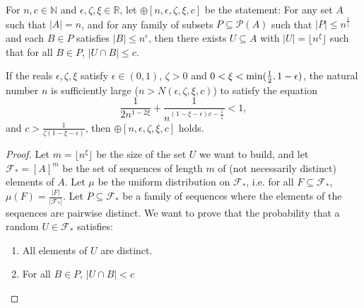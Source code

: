         \begin{definition} \label{def:n_large_enough_property}
            For $n, c \in \mathbb{N}$ and $\epsilon, \zeta, \xi \in \mathbb{R}$, let $\oplus[n, \epsilon, \zeta, \xi, c]$ be
            the statement:
            For any set $A$ such that $|A| = n$, and for any family of subsets $P \subseteq \mathcal{P}(A)$ such that
            $|P| \leq n^{\frac{1}{\zeta}}$ and each $B \in P$ satisfies $|B| \leq n^\epsilon$, then there exists $U \subseteq A$
            with $|U| = \lfloor n^\xi \rfloor$ such that for all $B \in P$, $|U \cap B| \leq c$.
        \end{definition}

        \begin{lemma} \label{lem:n_large_enough_valid_values}
            If the reals $\epsilon, \zeta, \xi$ satisfy $\epsilon \in (0,1)$, $\zeta > 0$ and $0 < \xi < \min ( \frac{1}{2}, 1 - \epsilon )$,
            the natural number $n$ is sufficiently large ($n > N(\epsilon, \zeta, \xi, c)$) to satisfy the equation
                \begin{equation} \label{eq:n_large_enough_valid_values.1}
                    \frac{1}{2n^{1-2\xi}} + \frac{1}{n^{(1 - \xi - \epsilon)c - \frac{1}{\zeta}}} < 1,
                \end{equation}
            and $c > \frac{1}{\zeta (1 - \xi - \epsilon)}$,
            then $\oplus[n, \epsilon, \zeta, \xi, c]$ holds.
            \begin{proof}
                Let $m = \lfloor n^\xi \rfloor$ be the size of the set $U$ we want to build, and let $\mathcal{F}_* = [A]^m$ be
                the set of sequences of length $m$ of (not necessarily distinct) elements of $A$.
                Let $\mu$ be the uniform distribution on $\mathcal{F}_*$, i.e. for all $F \subseteq \mathcal{F}_*$,
                $\mu(F) = \frac{|F|}{|\mathcal{F}_*|}$.
                Let $P \subseteq \mathcal{F}_*$ be a family of sequences where the elements of the sequences are pairwise distinct.
                We want to prove that the probability that a random $U \in \mathcal{F}_*$ satisfies:
                \begin{enumerate}[label={\Roman*}., ref={\Roman*}, font=\rmfamily]
                    \item\label{itm:n_large_enough_valid_values.1} All elements of $U$ are distinct.
                    \item\label{itm:n_large_enough_valid_values.2} For all $B \in P$, $|U \cap B| < c$

\end{enumerate}
\end{proof}
\end{lemma}
